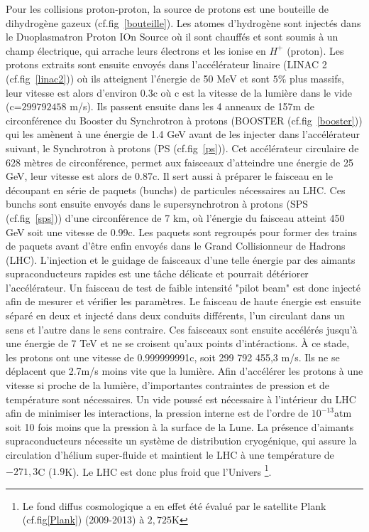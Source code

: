 Pour les collisions proton-proton, la source de protons est une bouteille de dihydrogène gazeux (cf.fig~\ref{bouteille}). Les atomes d’hydrogène sont injectés dans le Duoplasmatron Proton IOn Source où il sont chauffés et sont soumis à un champ électrique, qui arrache leurs électrons et les ionise en $H^{+}$ (proton). Les protons extraits sont ensuite envoyés dans l'accélérateur linaire (LINAC 2 (cf.fig~\ref{linac2})) où ils atteignent l'énergie de 50 MeV et sont $5\%$ plus massifs, leur vitesse est alors d'environ $0.3$c où c est la vitesse de la lumière dans le vide (c=$299 792 458$ m/s). Ils passent ensuite dans les 4 anneaux de 157m de circonférence du Booster du Synchrotron à protons (BOOSTER (cf.fig~\ref{booster})) qui les amènent à une énergie de 1.4 GeV avant de les injecter dans l'accélérateur suivant, le Synchrotron à protons (PS (cf.fig~\ref{ps})). Cet accélérateur circulaire de 628 mètres de circonférence, permet aux faisceaux d'atteindre une énergie de 25 GeV, leur vitesse est alors de 0.87c. Il sert aussi à préparer le faisceau en le découpant en série de paquets (bunchs) de particules nécessaires au LHC. Ces bunchs sont ensuite envoyés dans le supersynchrotron à protons (SPS (cf.fig~\ref{sps})) d'une circonférence de 7 km, où l'énergie du faisceau atteint 450 GeV soit une vitesse de 0.99c. Les paquets sont regroupés pour former des trains de paquets avant d'être enfin envoyés dans le Grand Collisionneur de Hadrons (LHC). L'injection et le guidage de faisceaux d'une telle énergie par des aimants supraconducteurs rapides est une tâche délicate et pourrait détériorer l'accélérateur. Un faisceau de test de faible intensité "pilot beam" est donc injecté afin de mesurer et vérifier les paramètres. Le faisceau de haute énergie est ensuite séparé en deux et injecté dans deux conduits différents, l'un circulant dans un sens et l'autre dans le sens contraire. Ces faisceaux sont ensuite accélérés jusqu'à une énergie de 7 TeV et ne se croisent qu'aux points d'intéractions. À ce stade, les protons ont une vitesse de 0.999999991c, soit 299 792 455,3 m/s. Ils ne se déplacent que 2.7m/s moins vite que la lumière. Afin d'accélérer les protons à une vitesse si proche de la lumière, d'importantes contraintes de pression et de température sont nécessaires. Un vide poussé est nécessaire à l'intérieur du LHC afin de minimiser les interactions, la pression interne est de l'ordre de $10^{-13}$atm soit 10 fois moins que la pression à la surface de la Lune. La présence d'aimants supraconducteurs nécessite un système de distribution cryogénique, qui assure la circulation d'hélium super-fluide et maintient le LHC à une température de $-271,3$\degre C ($1.9$K). Le LHC est donc plus froid que l'Univers \footnote{Le fond diffus cosmologique a en effet été évalué par le satellite Plank (cf.fig\ref{Plank}) (2009-2013) à $2,725$K}.

